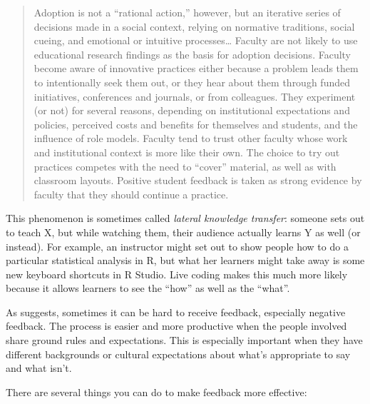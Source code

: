 \begin{quote}

  Adoption is not a ``rational action,'' however, but an iterative
  series of decisions made in a social context, relying on normative
  traditions, social cueing, and emotional or intuitive
  processes{\ldots} Faculty are not likely to use educational research
  findings as the basis for adoption decisions. Faculty become aware
  of innovative practices either because a problem leads them to
  intentionally seek them out, or they hear about them through funded
  initiatives, conferences and journals, or from colleagues. They
  experiment (or not) for several reasons, depending on institutional
  expectations and policies, perceived costs and benefits for
  themselves and students, and the influence of role models. Faculty
  tend to trust other faculty whose work and institutional context is
  more like their own. The choice to try out practices competes with
  the need to ``cover'' material, as well as with classroom
  layouts. Positive student feedback is taken as strong evidence by
  faculty that they should continue a practice.

\end{quote}

This phenomenon is sometimes called \emph{lateral knowledge transfer}:
someone sets out to teach X, but while watching them, their audience
actually learns Y as well (or instead). For example, an instructor
might set out to show people how to do a particular statistical
analysis in R, but what her learners might take away is some new
keyboard shortcuts in R Studio. Live coding makes this much more
likely because it allows learners to see the ``how'' as well as the
``what''.



As  suggests, sometimes it can be hard to receive
feedback, especially negative feedback.  The process is easier and
more productive when the people involved share ground rules and
expectations. This is especially important when they have different
backgrounds or cultural expectations about what's appropriate to say
and what isn't.

There are several things you can do to make feedback more effective:

